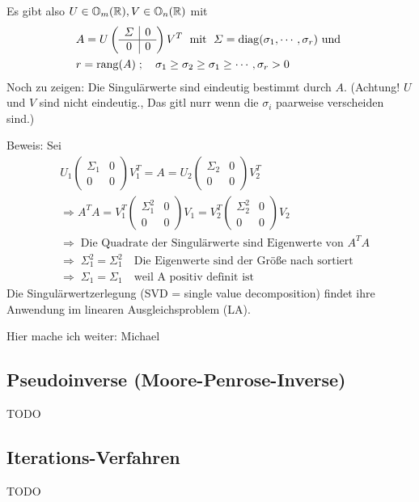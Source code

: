 Es gibt also $U \in \mathbb O_m(\mathbb R), V \in \mathbb O_n(\mathbb R)$ mit
\begin{align*}
  & A = U \left(\begin{array}{c|c} \varSigma & 0  \\ \hline 0 & 0 \end{array} \right) V^T \; \text{ mit } \; \varSigma = \operatorname*{\mathrm{diag}}(\sigma_1, \cdots , \sigma_r) \text{ und }\\
  & r = \operatorname*{\mathrm{rang}}(A) \; ; \quad \sigma_1\ge \sigma_2\ge\sigma_1\ge  \cdots , \sigma_r > 0
\end{align*}
Noch zu zeigen: Die Singulärwerte sind eindeutig bestimmt durch $A$.
(Achtung! $U$ und $V$ sind nicht eindeutig., Das gitl nurr wenn die $\sigma_i$
paarweise verscheiden sind.)

Beweis: Sei
\begin{align*}
  & U_1 \left(\begin{array}{c|c} \varSigma_1 & 0  \\ \hline 0 & 0 \end{array} \right) V_1^T =
A = U_2 \left(\begin{array}{c|c} \varSigma_2 & 0  \\ \hline 0 & 0 \end{array} \right) V_2^T \\
& \Rightarrow A^T A = V_1^T \left(\begin{array}{c|c} \varSigma_1^2 & 0  \\ \hline 0 & 0 \end{array} \right) V_1 = V_2^T \left(\begin{array}{c|c} \varSigma_2^2 & 0  \\ \hline 0 & 0 \end{array} \right) V_2 \\
& \Rightarrow \; \text{Die Quadrate der Singulärwerte sind Eigenwerte von } A^T A\\
& \Rightarrow \; \varSigma_1^2 = \varSigma_1^2  \quad \text{Die Eigenwerte sind der Größe nach sortiert}\\
& \Rightarrow \;  \varSigma_1 = \varSigma_1 \quad \text{weil A positiv definit ist}
\end{align*}
Die Singulärwertzerlegung (SVD = single value decomposition) findet ihre Anwendung im
linearen Ausgleichsproblem (LA).


Hier mache ich weiter: Michael

\subsection{Pseudoinverse (Moore-Penrose-Inverse)}

TODO

\subsection{Iterations-Verfahren}


TODO
